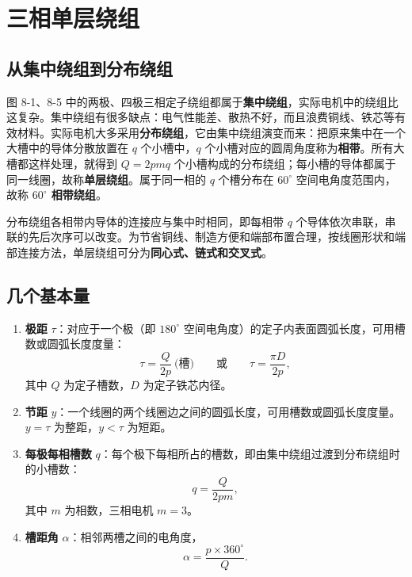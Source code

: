 \section{三相单层绕组}

\subsection{从集中绕组到分布绕组}
图 8-1、8-5 中的两极、四极三相定子绕组都属于\textbf{集中绕组}，实际电机中的绕组比这复杂。集中绕组有很多缺点：电气性能差、散热不好，而且浪费铜线、铁芯等有效材料。实际电机大多采用\textbf{分布绕组}，它由集中绕组演变而来：把原来集中在一个大槽中的导体分散放置在 $q$ 个小槽中，$q$ 个小槽对应的圆周角度称为\textbf{相带}。所有大槽都这样处理，就得到 $Q=2pmq$ 个小槽构成的分布绕组；每小槽的导体都属于同一线圈，故称\textbf{单层绕组}。属于同一相的 $q$ 个槽分布在 $60^\circ$ 空间电角度范围内，故称 \textbf{$60^\circ$ 相带绕组}。

分布绕组各相带内导体的连接应与集中时相同，即每相带 $q$ 个导体依次串联，串联的先后次序可以改变。为节省铜线、制造方便和端部布置合理，按线圈形状和端部连接方法，单层绕组可分为\textbf{同心式、链式和交叉式}。

\subsection{几个基本量}
\begin{enumerate}
  \item \textbf{极距} $\tau$：对应于一个极（即 $180^\circ$ 空间电角度）的定子内表面圆弧长度，可用槽数或圆弧长度度量：
  \begin{equation}
  \tau=\frac{Q}{2p}\ \text{(槽)}\qquad\text{或}\qquad \tau=\frac{\pi D}{2p},
  \end{equation}
  其中 $Q$ 为定子槽数，$D$ 为定子铁芯内径。
  \item \textbf{节距} $y$：一个线圈的两个线圈边之间的圆弧长度，可用槽数或圆弧长度度量。$y=\tau$ 为整距，$y<\tau$ 为短距。
  \item \textbf{每极每相槽数} $q$：每个极下每相所占的槽数，即由集中绕组过渡到分布绕组时的小槽数：
  \begin{equation}
  q=\frac{Q}{2pm},
  \end{equation}
  其中 $m$ 为相数，三相电机 $m=3$。
  \item \textbf{槽距角} $\alpha$：相邻两槽之间的电角度，
  \begin{equation}
  \alpha=\frac{p\times360^\circ}{Q}.
  \end{equation}
\end{enumerate}

